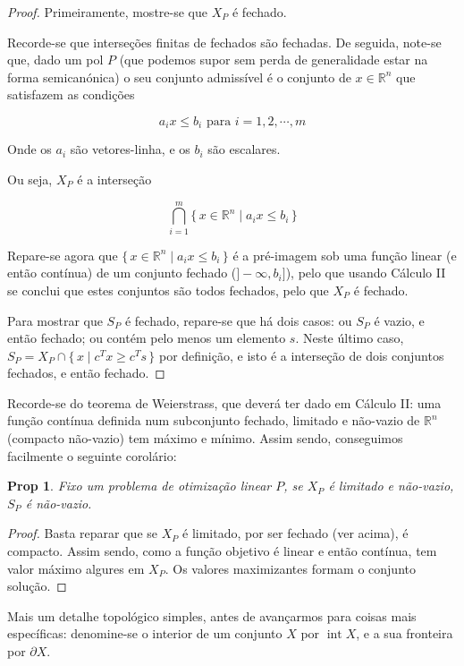 \documentclass{article}
\DeclareMathOperator{\interior}{int}
\newcommand{\R}{\mathbb{R}}
\newtheorem{prop}{Prop}
\theoremstyle{definition}
\begin{document}
	\begin{proof}
	Primeiramente, mostre-se que $X_P$ é fechado.
	
	Recorde-se que interseções finitas de fechados são fechadas. De seguida, note-se que, dado um pol $P$ (que podemos supor sem perda de generalidade estar na forma semicanónica) o seu conjunto admissível é o conjunto de $x \in \R^n$ que satisfazem as condições
	
	\[a_i x \leq b_i \text{ para $i = 1, 2, \cdots, m$}\]
	
	Onde os $a_i$ são vetores-linha, e os $b_i$ são escalares.
	
	Ou seja, $X_P$ é a interseção
	
	\[\bigcap_{i=1}^m \{\,x \in \R^n \mid a_i x \leq b_i \,\}\]
	
	Repare-se agora que $\{\,x \in \R^n \mid a_i x \leq b_i \,\}$ é a pré-imagem sob uma função linear (e então contínua) de um conjunto fechado ($]-\infty, b_i]$), pelo que usando Cálculo II se conclui que estes conjuntos são todos fechados, pelo que $X_P$ é fechado.
	
	Para mostrar que $S_P$ é fechado, repare-se que há dois casos: ou $S_P$ é vazio, e então fechado; ou contém pelo menos um elemento $s$. Neste último caso, $S_P = X_P \cap \{\,x \mid c^T x \geq c^T s\,\}$ por definição, e isto é a interseção de dois conjuntos fechados, e então fechado.
	\end{proof}
	
	Recorde-se do teorema de Weierstrass, que deverá ter dado em Cálculo II: uma função contínua definida num subconjunto fechado, limitado e não-vazio de $\R^n$ (compacto não-vazio) tem máximo e mínimo. Assim sendo, conseguimos facilmente o seguinte corolário:
	
	\begin{prop}
	Fixo um problema de otimização linear $P$, se $X_P$ é limitado e não-vazio, $S_P$ é não-vazio.
	\end{prop}
	\begin{proof}
	Basta reparar que se $X_P$ é limitado, por ser fechado (ver acima), é compacto. Assim sendo, como a função objetivo é linear e então contínua, tem valor máximo algures em $X_P$. Os valores maximizantes formam o conjunto solução.
	\end{proof}
	
	Mais um detalhe topológico simples, antes de avançarmos para coisas mais específicas: denomine-se o interior de um conjunto $X$ por $\interior X$, e a sua fronteira por $\partial X$.
	
\end{document}
